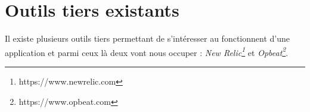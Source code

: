 \section{Outils tiers existants}
Il existe plusieurs outils tiers permettant de s'intéresser au fonctionnent d'une application \Python et parmi ceux là deux vont nous occuper : \emph{New Relic\footnote{https://www.newrelic.com}} et \emph{Opbeat\footnote{https://www.opbeat.com}}.